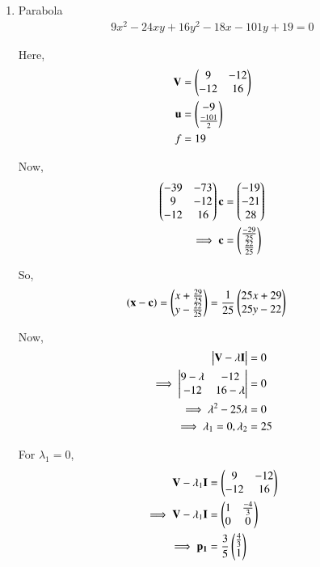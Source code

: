 \documentclass[journal,12pt,twocolumn]{IEEEtran}
\begin{document}
\begin{enumerate}
    \item Parabola
    \begin{align}
    9x^2-24xy+16y^2-18x-101y+19 = 0
    \end{align}
    
    Here,
    \begin{align}
    \mathbf{V} &= \begin{pmatrix}9 & -12 \\ -12 & 16\end{pmatrix} \\
    \mathbf{u} &= \begin{pmatrix}-9 \\ \frac{-101}{2}\end{pmatrix} \\
    f &= 19
    \end{align}

    Now,
    \begin{align}
    \begin{pmatrix}-39 & -73 \\ 9 & -12 \\ -12 & 16\end{pmatrix}\mathbf{c} &= \begin{pmatrix}-19 \\ -21 \\ 28\end{pmatrix}
    \\
    \implies \mathbf{c} &= \begin{pmatrix}\frac{-29}{25} \\ \frac{22}{25}\end{pmatrix}
    \end{align}
    
    So,
    \begin{align}
    \left(\mathbf{x}-\mathbf{c}\right) &= \begin{pmatrix}x+\frac{29}{25} \\ y-\frac{22}{25}\end{pmatrix}=\frac{1}{25}\begin{pmatrix}25x+29 \\ 25y-22\end{pmatrix}
    \end{align}
    
    Now,
    \begin{align}
        \begin{vmatrix}\mathbf{V}-\lambda\mathbf{I}\end{vmatrix} &= 0 \\
        \implies \begin{vmatrix}9-\lambda & -12 \\ -12 & 16-\lambda\end{vmatrix} &= 0 \\
        \implies \lambda^2-25\lambda &= 0 \\
        \implies \lambda_1 =0,\lambda_2 &= 25
    \end{align}
    
    For $\lambda_1=0$,
    \begin{align}
        \mathbf{V}-\lambda_1\mathbf{I} &= \begin{pmatrix}9 & -12 \\ -12 & 16\end{pmatrix} \\
        \implies \mathbf{V}-\lambda_1\mathbf{I} &= \begin{pmatrix}1 & \frac{-4}{3} \\ 0 & 0\end{pmatrix} \\
        \implies \mathbf{p_1} &=\frac{3}{5}\begin{pmatrix}\frac{4}{3} \\ 1\end{pmatrix}
    \end{align}
    

\end{enumerate}
\end{document}

